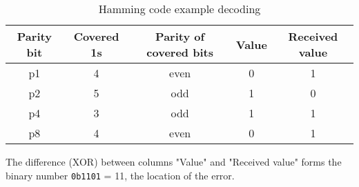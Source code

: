\def\arraystretch{1.5}
\begin{table}[H]
  \centering

  \medskip

  \begin{tabular}{|c|c|c|c|c|}
    \hline
    \rowcolor{tabgrey} Parity bit & Covered 1s & Parity of covered bits & Value & Received value \\
    \hline
    p1 & 4 & even & 0 & 1 \\
    \hline
    p2 & 5 & odd & 1 & 0 \\
    \hline
    p4 & 3 & odd & 1 & 1 \\
    \hline
    p8 & 4 & even & 0 & 1 \\
    \hline
  \end{tabular}
  \caption{Hamming code example decoding}
  \label{tab:hamming_ex_decoding}
\end{table}
\def\arraystretch{1}

The difference (XOR) between columns "Value" and "Received value" forms the binary number \texttt{0b1101} = 11, the location of the error.


